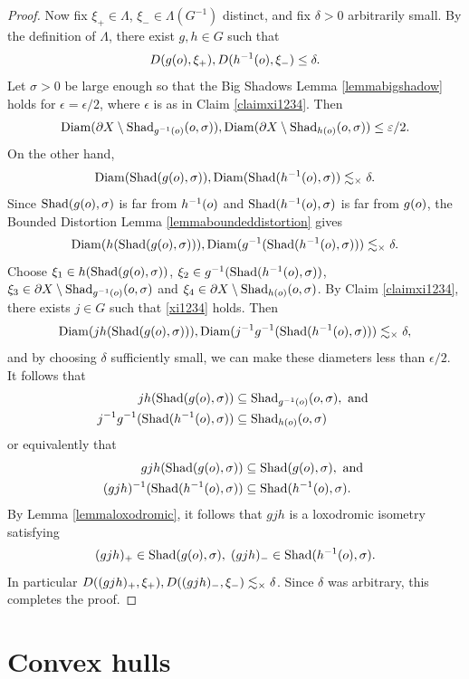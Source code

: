 \begin{proof}
Now fix $\xi_+\in\Lambda$, $\xi_-\in\Lambda(G^{-1})$ distinct, and fix $\delta > 0$ arbitrarily small. By the definition of $\Lambda$, there exist $g,h\in G$ such that
\[
D(g(o),\xi_+) , D(h^{-1}(o),\xi_-) \leq \delta.
\]
Let $\sigma > 0$ be large enough so that the Big Shadows Lemma \ref{lemmabigshadow} holds for $\epsilon = \epsilon/2$, where $\epsilon$ is as in Claim \ref{claimxi1234}. Then
\[
\operatorname{Diam}(\partial X\setminus\operatorname{Shad}_{g^{-1}(o)}(o,\sigma)) , \operatorname{Diam}(\partial X\setminus \operatorname{Shad}_{h(o)}(o,\sigma)) \leq \varepsilon/2.
\]
On the other hand,
\[
\operatorname{Diam}(\operatorname{Shad}(g(o),\sigma)) , \operatorname{Diam}(\operatorname{Shad}(h^{-1}(o),\sigma)) \lesssim_\times \delta.
\]
Since $\operatorname{Shad}(g(o),\sigma)$ is far from $h^{-1}(o)$ and $\operatorname{Shad}(h^{-1}(o),\sigma)$ is far from $g(o)$, the Bounded Distortion Lemma \ref{lemmaboundeddistortion} gives
\[
\operatorname{Diam}(h(\operatorname{Shad}(g(o),\sigma))) , \operatorname{Diam}(g^{-1}(\operatorname{Shad}(h^{-1}(o),\sigma))) \lesssim_\times \delta.
\]
Choose $\xi_1\in h(\operatorname{Shad}(g(o),\sigma))$, $\xi_2\in g^{-1}(\operatorname{Shad}(h^{-1}(o),\sigma))$, $\xi_3\in \partial X\setminus\operatorname{Shad}_{g^{-1}(o)}(o,\sigma)$ and $\xi_4\in \partial X\setminus\operatorname{Shad}_{h(o)}(o,\sigma)$. By Claim \ref{claimxi1234}, there exists $j\in G$ such that \eqref{xi1234} holds. Then
\[
\operatorname{Diam}(jh(\operatorname{Shad}(g(o),\sigma))) , \operatorname{Diam}(j^{-1} g^{-1}(\operatorname{Shad}(h^{-1}(o),\sigma))) \lesssim_\times \delta,
\]
and by choosing $\delta$ sufficiently small, we can make these diameters less than $\epsilon/2$. It follows that
\begin{align*}
jh(\operatorname{Shad}(g(o),\sigma)) &\subseteq \operatorname{Shad}_{g^{-1}(o)}(o,\sigma), \textup{ and }\\ 
j^{-1} g^{-1}(\operatorname{Shad}(h^{-1}(o),\sigma)) &\subseteq \operatorname{Shad}_{h(o)}(o,\sigma)
\end{align*}
or equivalently that
\begin{align*}
gjh(\operatorname{Shad}(g(o),\sigma)) &\subseteq \operatorname{Shad}(g(o),\sigma), \textup{ and }\\ 
(gjh)^{-1}(\operatorname{Shad}(h^{-1}(o),\sigma)) &\subseteq \operatorname{Shad}(h^{-1}(o),\sigma).
\end{align*}
By Lemma \ref{lemmaloxodromic}, it follows that $gjh$ is a loxodromic isometry satisfying
\[
(gjh)_+\in\operatorname{Shad}(g(o),\sigma) ,\; (gjh)_-\in\operatorname{Shad}(h^{-1}(o),\sigma).
\]
In particular $D((gjh)_+,\xi_+) , D((gjh)_-,\xi_-) \lesssim_\times \delta$. Since $\delta$ was arbitrary, this completes the proof.
\end{proof}

\bigskip
\section{Convex hulls}
\label{subsectionconvexhulls}

